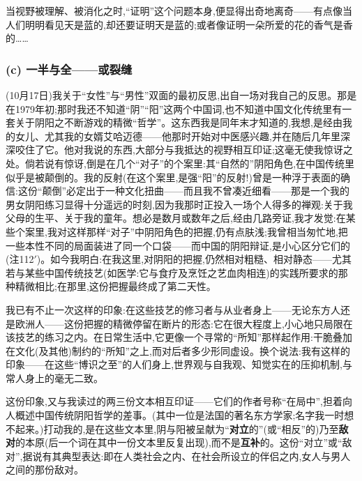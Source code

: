 当视野被理解、被消化之时,“证明”这个问题本身,便显得出奇地离奇——有点像当人们明明看见天是蓝的,却还要证明天是蓝的;或者像证明一朵所爱的花的香气是香的……

\subsubsection*{(c) 一半与全——或裂缝}
\label{ch18:local:h14}

\label{ch18:local:n13}

(10月17日)我关于“女性”与“男性”双面的最初反思,出自一场对我自己的反思。那是在1979年初;那时我还不知道“阴”“阳”这两个中国词,也不知道中国文化传统里有一套关于阴阳之不断游戏的精微“哲学”。这东西我是同年末才知道的,我想,是经由我的女儿、尤其我的女婿艾哈迈德——他那时开始对中医感兴趣,并在随后几年里深深咬住了它。他对我说的东西,大部分与我抵达的视野相互印证;这毫无使我惊讶之处。倘若说有惊讶,倒是在几个“对子”的个案里:其“自然的”阴阳角色,在中国传统里似乎是被颠倒的。我的反射(在这个案里,是强“阳”的反射!)曾是一种浮于表面的确信:这份“颠倒”必定出于一种文化扭曲——而且我不曾凑近细看\dmark{}——那是一个我的男女阴阳练习显得十分遥远的时刻,因为我那时正投入一场个人得多的禅观:关于我父母的生平、关于我的童年。想必是数月或数年之后,经由几路旁证,我才发觉:在某些个案里,我对这样那样“对子”中阴阳角色的把握,仍有点肤浅;我曾相当匆忙地,把一些本性不同的局面装进了同一个口袋——而中国的阴阳辩证,是小心区分它们的(注112$'$)。如今我明白:在我这里,对阴阳的把握,仍然相对粗糙、相对静态——尤其若与某些中国传统技艺(如医学:它与食疗及烹饪之艺血肉相连)的实践所要求的那种精微相比;在那里,这份把握最终成了第二天性。

我已有不止一次这样的印象:在这些技艺的修习者与从业者身上——无论东方人还是欧洲人——这份把握的精微停留在断片的形态:它在很大程度上,小心地只局限在该技艺的练习之内。在日常生活中,它更像一个寻常的“所知”那样起作用:干脆叠加在文化(及其他)制约的“所知”之上,而对后者多少形同虚设。换个说法:我有这样的印象——在这些“博识之至”的人们身上,世界观与自我观、知觉实在的压抑机制,与常人身上的毫无二致。

这份印象,又与我读过的两三份文本相互印证——它们的作者号称“在局中”,担着向人概述中国传统阴阳哲学的差事。(其中一位是法国的著名东方学家;名字我一时想不起来。)打动我的,是在这些文本里,阴与阳被呈献为“\textbf{对立}的”(或“相反”的)乃至\textbf{敌对}的本原(后一个词在其中一份文本里反复出现),而不是\textbf{互补}的。这份“对立”或“敌对”,据说有其典型表达:即在人类社会之内、在社会所设立的伴侣之内,女人与男人之间的那份敌对。

